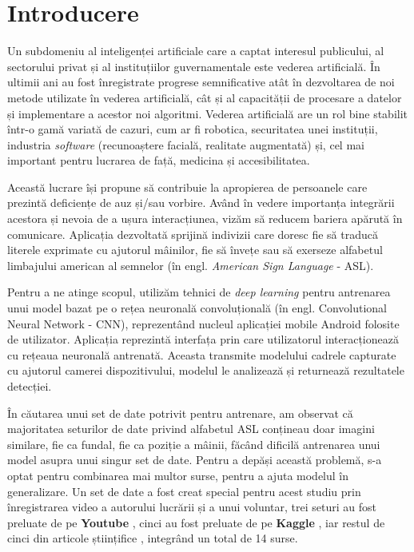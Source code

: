 \chapter{Introducere}

Un subdomeniu al inteligenței artificiale care a captat interesul publicului, al sectorului privat și al instituțiilor guvernamentale este vederea artificială. În ultimii ani au fost înregistrate progrese semnificative atât în dezvoltarea de noi metode utilizate în vederea artificială, cât și al capacității de procesare a datelor și implementare a acestor noi algoritmi. Vederea artificială are un rol bine stabilit într-o gamă variată de cazuri, cum ar fi robotica, securitatea unei instituții, industria \textit{software} (recunoaștere facială, realitate augmentată) și, cel mai important pentru lucrarea de față, medicina și accesibilitatea.

Această lucrare își propune să contribuie la apropierea de persoanele care prezintă deficiențe de auz și/sau vorbire. Având în vedere importanța integrării acestora și nevoia de a ușura interacțiunea, vizăm să reducem bariera apărută în comunicare. Aplicația dezvoltată sprijină indivizii care doresc fie să traducă literele exprimate cu ajutorul mâinilor, fie să învețe sau să exerseze alfabetul limbajului american al semnelor (în engl. \textit{American Sign Language} - ASL).

Pentru a ne atinge scopul, utilizăm tehnici de \textit{deep learning} pentru antrenarea unui model bazat pe o rețea neuronală convoluțională (în engl. Convolutional Neural Network - CNN), reprezentând nucleul aplicației mobile Android folosite de utilizator. Aplicația reprezintă interfața prin care utilizatorul interacționează cu rețeaua neuronală antrenată. Aceasta transmite modelului cadrele capturate cu ajutorul camerei dispozitivului, modelul le analizează și returnează rezultatele detecției.

În căutarea unui set de date potrivit pentru antrenare, am observat că majoritatea seturilor de date privind alfabetul ASL conțineau doar imagini similare, fie ca fundal, fie ca poziție a mâinii, făcând dificilă antrenarea unui model asupra unui singur set de date. Pentru a depăși această problemă, s-a optat pentru combinarea mai multor surse, pentru a ajuta modelul în generalizare. Un set de date a fost creat special pentru acest studiu prin înregistrarea video a autorului lucrării și a unui voluntar, trei seturi au fost preluate de pe \textbf{Youtube} \cite{youtube_dataset0, youtube_dataset1, youtube_dataset2}, cinci au fost preluate de pe \textbf{Kaggle} \cite{kaggle_dataset0, kaggle_dataset1, kaggle_dataset2, kaggle_dataset3, kaggle_dataset4}, iar restul de cinci din articole științifice \cite{article_dataset0, article_dataset1, article_dataset2, article_dataset3, article_dataset4}, integrând un total de 14 surse.

